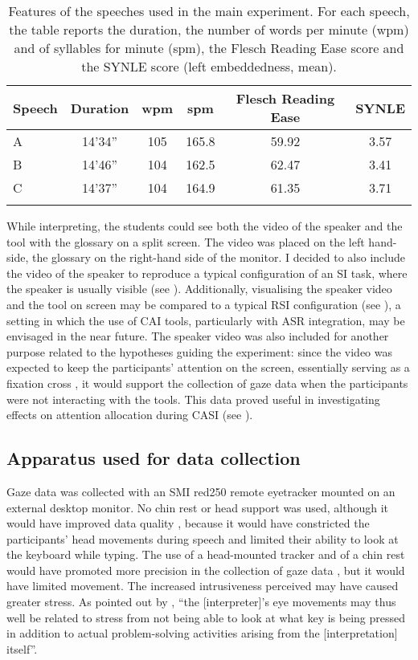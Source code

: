 \begin{table}
 \begin{tabular}{lc c c c c}
 \lsptoprule
 {Speech} & {Duration} & {wpm} & {spm} & {Flesch Reading Ease} & {SYNLE}\\
 \midrule
 A & 14'34'' & 105 & 165.8 & 59.92 & 3.57\\
 B & 14'46'' & 104 & 162.5 & 62.47 & 3.41\\
 C & 14'37'' & 104 & 164.9 & 61.35 & 3.71\\
 \lspbottomrule
 \end{tabular}
\caption[Features of the speeches used in the main experiment]{Features of the speeches used in the main experiment. For each speech, the table reports the duration, the number of words per minute (wpm) and of syllables for minute (spm), the Flesch Reading Ease score and the SYNLE score (left embeddedness, mean).\label{tab:features_speech}}
\end{table}


While interpreting, the students could see both the video of the speaker and the tool with the glossary on a split screen. The video was placed on the left hand-side, the glossary on the right-hand side of the monitor. I decided to also include the video of the speaker to reproduce a typical configuration of an SI task, where the speaker is usually visible (see \citealt{seeber_multimodal_2017}). Additionally, visualising the speaker video and the tool on screen may be compared to a typical RSI configuration (see ), a setting in which the use of CAI tools, particularly with ASR integration, may be envisaged in the near future. The speaker video was also included for another purpose related to the hypotheses guiding the experiment: since the video was expected to keep the participants' attention on the screen, essentially serving as a fixation cross \citep{conklin_eye-tracking_2018}, it would support the collection of gaze data when the participants were not interacting with the tools. This data proved useful in investigating effects on attention allocation during CASI (see ).


\subsection{Apparatus used for data collection} \label{apparatus_MS}
Gaze data was collected with an SMI red250 remote eyetracker mounted on an external desktop monitor. No chin rest or head support was used, although it would have improved data quality \citep[83]{holmqvist_eye_2011}, because it would have constricted the participants' head movements during speech and limited their ability to look at the keyboard while typing. The use of a head-mounted tracker and of a chin rest would have promoted more precision in the collection of gaze data \citep[17]{conklin_eye-tracking_2018}, but it would have limited movement. The increased intrusiveness perceived may have caused greater stress. As pointed out by \citet[206]{hvelplund_eye_2014}, ``the [interpreter]'s eye movements may thus well be related to stress from not being able to look at what key is being pressed in addition to actual problem-solving activities arising from the [interpretation] itself''.


